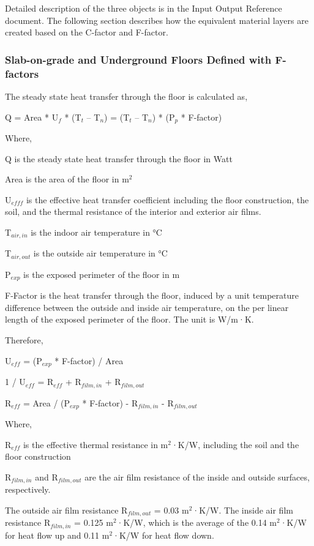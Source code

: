 Detailed description of the three objects is in the Input Output Reference document. The following section describes how the equivalent material layers are created based on the C-factor and F-factor.

\subsubsection{Slab-on-grade and Underground Floors Defined with F-factors}\label{slab-on-grade-and-underground-floors-defined-with-f-factors}

The steady state heat transfer through the floor is calculated as,

Q = Area * U\(_{f}\) * (T\(_{t}\) -- T\(_{n}\)) = (T\(_{t}\) -- T\(_{n}\)) * (P\(_{p}\) * F-factor)

Where,

Q is the steady state heat transfer through the floor in Watt

Area is the area of the floor in m\(^{2}\)

U\(_{efff}\) is the effective heat transfer coefficient including the floor construction, the soil, and the thermal resistance of the interior and exterior air films.

T\(_{air,in}\) is the indoor air temperature in °C

T\(_{air,out}\) is the outside air temperature in °C

P\(_{exp}\) is the exposed perimeter of the floor in m

F-Factor is the heat transfer through the floor, induced by a unit temperature difference between the outside and inside air temperature, on the per linear length of the exposed perimeter of the floor. The unit is W/m·K.

Therefore,

U\(_{eff}\) = (P\(_{exp}\) * F-factor) / Area

1 / U\(_{eff}\) = R\(_{eff}\) + R\(_{film,in}\) + R\(_{film,out}\)

R\(_{eff}\) = Area / (P\(_{exp}\) * F-factor) - R\(_{film,in}\) - R\(_{film,out}\)

Where,

R\(_{eff}\) is the effective thermal resistance in m\(^{2}\)·K/W, including the soil and the floor construction

R\(_{film,in}\) and R\(_{film,out}\) are the air film resistance of the inside and outside surfaces, respectively.

The outside air film resistance R\(_{film,out}\) = 0.03 m\(^{2}\)·K/W. The inside air film resistance R\(_{film,in}\) = 0.125 m\(^{2}\)·K/W, which is the average of the 0.14 m\(^{2}\)·K/W for heat flow up and 0.11 m\(^{2}\)·K/W for heat flow down.

